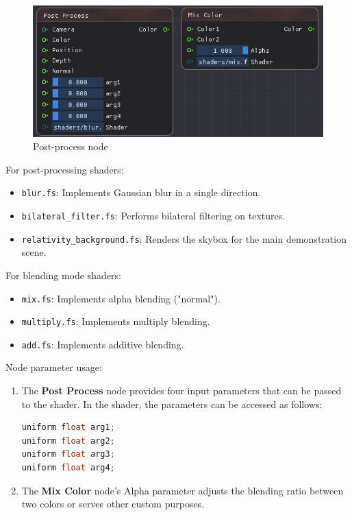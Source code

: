 \documentclass{article}
\begin{document}
\begin{figure}[htbp]
    \centering
    \setlength{\abovecaptionskip}{0.cm}
    \begin{minipage}[b]{0.6\linewidth}
        \centering
        \includegraphics[width=\textwidth]{PostProcess.png}
        \caption{Post-process node}
        \label{postprocess}
    \end{minipage}
\end{figure}

For post-processing shaders:
\begin{itemize}
    \item \lstinline|blur.fs|: Implements Gaussian blur in a single direction.
    \item \lstinline|bilateral_filter.fs|: Performs bilateral filtering on textures.
    \item \lstinline|relativity_background.fs|: Renders the skybox for the main demonstration scene.
\end{itemize}

For blending mode shaders:
\begin{itemize}
    \item \lstinline|mix.fs|: Implements alpha blending ("normal").
    \item \lstinline|multiply.fs|: Implements multiply blending.
    \item \lstinline|add.fs|: Implements additive blending.
\end{itemize}

Node parameter usage:
\begin{enumerate}[(1)]
    \item The \textbf{Post Process} node provides four input parameters that can be passed to the shader. In the shader, the parameters can be accessed as follows:
\begin{lstlisting}[language=C++, title=Shader Input Parameters]
uniform float arg1;
uniform float arg2;
uniform float arg3;
uniform float arg4;
\end{lstlisting}
    \item The \textbf{Mix Color} node's Alpha parameter adjusts the blending ratio between two colors or serves other custom purposes.
\end{enumerate}
\end{document}
